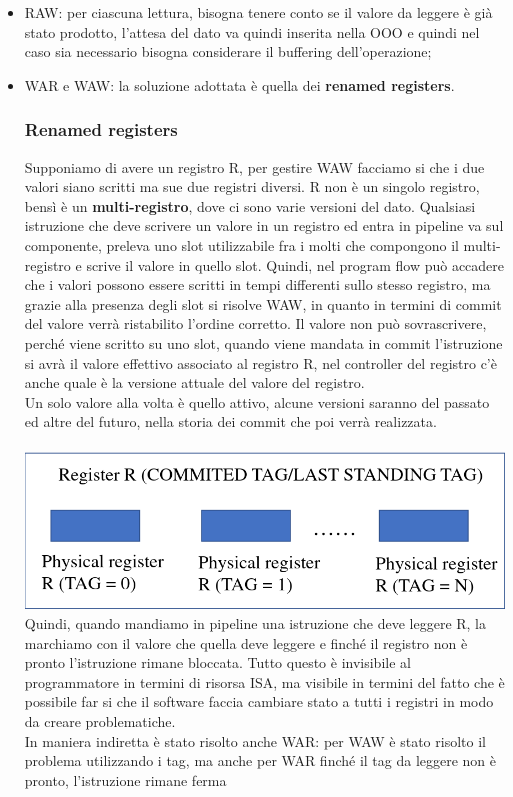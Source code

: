 \documentclass[12pt, oneside]{extbook}
\begin{document}
\begin{itemize}
\item RAW: per ciascuna lettura, bisogna tenere conto se il valore da leggere è già stato prodotto, l'attesa del dato va quindi inserita nella OOO e quindi nel caso sia necessario bisogna considerare il buffering dell'operazione;
\item WAR e WAW: la soluzione adottata è quella dei \textbf{renamed registers}. 
\subsubsection{Renamed registers}
Supponiamo di avere un registro R, per gestire WAW facciamo si che i due valori siano scritti ma sue due registri diversi. R non è un singolo registro, bensì è un \textbf{multi-registro}, dove ci sono varie versioni del dato. Qualsiasi istruzione che deve scrivere un valore in un registro ed entra in pipeline va sul componente, preleva uno slot utilizzabile fra i molti che compongono il multi-registro e scrive il valore in quello slot. Quindi, nel program flow può accadere che i valori possono essere scritti in tempi differenti sullo stesso registro, ma grazie alla presenza degli slot si risolve WAW, in quanto in termini di commit del valore verrà ristabilito l'ordine corretto. Il valore non può sovrascrivere, perché viene scritto su uno slot, quando viene mandata in commit l'istruzione si avrà il valore effettivo associato al registro R, nel controller del registro c'è anche quale è la versione attuale del valore del registro.\\ Un solo valore alla volta è quello attivo, alcune versioni saranno del passato ed altre del futuro, nella storia dei commit che poi verrà realizzata.\\\\
\includegraphics[scale=0.25]{immagini/multi-registri}\\
Quindi, quando mandiamo in pipeline una istruzione che deve leggere R, la marchiamo con il valore che quella deve leggere e finché il registro non è pronto l'istruzione rimane bloccata. Tutto questo è invisibile al programmatore in termini di risorsa ISA, ma visibile in termini del fatto che è possibile far si che il software faccia cambiare stato a tutti i registri in modo da creare problematiche.\\ In maniera indiretta è stato risolto anche WAR: per WAW è stato risolto il problema utilizzando i tag, ma anche per WAR finché il tag da leggere non è pronto, l'istruzione rimane ferma
\end{itemize}
\end{document}
